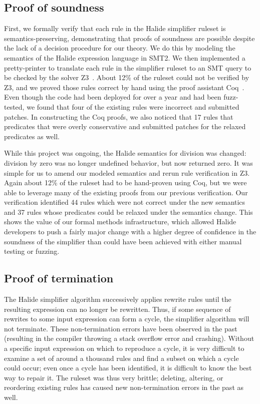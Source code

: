\subsection{Proof of soundness}
First, we formally verify that each rule in the Halide simplifier ruleset is semantics-preserving, demonstrating that proofs of soundness are possible despite the lack of a 
decision procedure for our theory. We do this by modeling the semantics of the Halide expression language in SMT2. We then implemented a pretty-printer to translate each rule in the simplifier ruleset to an SMT query to be checked by the solver Z3~\cite{de2008z3}. About 12\% of the ruleset could not be verified by Z3, and we proved those rules correct by hand using the proof assistant Coq~\cite{Coq19}. Even though the code had been deployed for over a year and had been fuzz-tested, we found that four of the existing rules were incorrect and submitted patches. In constructing the Coq proofs, we also noticed that 17 rules that predicates that were overly conservative and submitted patches for the relaxed predicates as well.

While this project was ongoing, the Halide semantics for division was changed: division by zero was no longer undefined behavior, but now returned zero. It was simple for us to amend our modeled semantics and rerun rule verification in Z3. Again about 12\% of the ruleset had to be hand-proven using Coq, but we were able to leverage many of the existing proofs from our previous verification. Our verification identified 44 rules which were not correct under the new semantics and 37 rules whose predicates could be relaxed under the semantics change. This shows the value of our formal methods infrastructure, which allowed Halide developers to push a fairly major change with a higher degree of confidence in the soundness of the simplifier than could have been achieved with either manual testing or fuzzing.

\subsection{Proof of termination}
The Halide simplifier algorithm successively applies rewrite rules until the resulting expression can no longer be rewritten. Thus, if some sequence of rewrites to some input expression can form a cycle, the simplifier algorithm will not terminate. These non-termination errors have been observed in the past (resulting in the compiler throwing a stack overflow error and crashing). Without a specific input expression on which to reproduce a cycle, it is very difficult to examine a set of around a thousand rules and find a subset on which a cycle could occur; even once a cycle has been identified, it is difficult to know the best way to repair it. The ruleset was thus very brittle; deleting, altering, or reordering existing rules has caused new non-termination errors in the past as well.

